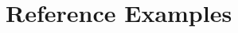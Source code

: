 \documentclass[journal,twoside,web]{ieeecolor}
\begin{document}
\section{Reference Examples}
%
%
%
%
%
%
%
%
\end{document}
